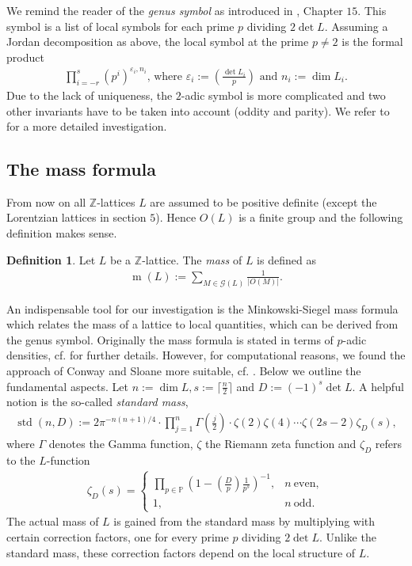 \documentclass{amsart}
\theoremstyle{definition}
\newtheorem{defn}[thm]{Definition}
\theoremstyle{remark}
\def\ZZ{\mathbb{Z}}
\def\PP{\mathbb{P}}
\DeclareMathOperator{\std}{std}
\DeclareMathOperator{\m}{m}
\begin{document}
We remind the reader of the \emph{genus symbol} as introduced in \cite{cs99}, Chapter $15$. 
This symbol is a list of local symbols for each prime $p$ dividing $2\det L$. Assuming a Jordan decomposition as above, the local symbol at the prime $p \neq 2$ is the formal product
\begin{align*}
 \text{$\prod_{i=-r}^{s} (p^{i})^{\varepsilon_i,n_i}$, where $\varepsilon_i := \left(\frac{\det L_i}{p}\right)$ and $n_i:=\dim L_i$.}
\end{align*}
Due to the lack of uniqueness, the $2$-adic symbol is more complicated and two other invariants have to be taken into account (oddity and parity).
We refer to \cite{cs99} for a more detailed investigation.

\subsection{The mass formula}
From now on all $\ZZ$-lattices $L$ are assumed to be positive definite (except the Lorentzian lattices in section $5$). Hence $O(L)$ is a finite group and the following definition makes sense.

\begin{defn}Let $L$ be a $\ZZ$-lattice. The \emph{mass} of $L$ is defined as
 \begin{align*}
  \m(L):= \sum_{M \in \mathcal{G}(L)}\frac{1}{|O(M)|}.
 \end{align*}
\end{defn}
An indispensable tool for our investigation is the Minkowski-Siegel mass formula
which relates the mass of a lattice to local quantities, which can be derived from the genus symbol. Originally the mass formula is stated in terms of $p$-adic densities, 
cf. \cite{sie35} for further details.
However, for computational reasons, we found the approach of Conway and Sloane more suitable, cf. \cite{cs88}. Below we outline the fundamental aspects. 
Let $n:=\dim L, s:=\lceil \frac{n}{2} \rceil$ and $D:=(-1)^s\det L$.
A helpful notion is the so-called \emph{standard mass},
\begin{align*}
 \std(n,D):= 2\pi^{-n(n+1)/4} \cdot \prod_{j=1}^{n}\Gamma(\tfrac{j}{2}) \cdot \zeta(2)\zeta(4) \cdots \zeta(2s-2)\zeta_D(s),
\end{align*}
where $\Gamma$ denotes the Gamma function, $\zeta$ the Riemann zeta function and $\zeta_D$ refers to the $L$-function
\begin{align*}
 \zeta_D(s)=
  \begin{cases}
   \prod_{p \in \PP}\left(1-\left(\tfrac{D}{p}\right)\frac{1}{p^s}\right)^{-1}, & n\ \text{even}, \\
   1,                                                                           & n\ \text{odd}.
  \end{cases}
\end{align*}
The actual mass of $L$ is gained from the standard mass by multiplying with certain correction factors, one for every prime $p$ dividing $2\det L$. 
Unlike the standard mass, these correction factors depend on the local structure of $L$.
\end{document}
